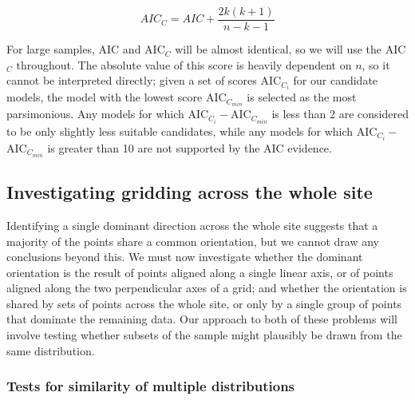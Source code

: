 \documentclass[../../ArchStats.tex]{subfiles}
\begin{document}
\[AIC_C = AIC + \frac{2k(k+1)}{n-k-1} \]

For large samples, AIC and AIC$_C$ will be almost identical, so we will use the AIC$_C$ throughout. The absolute value of this score is heavily dependent on $n$, so it cannot be interpreted directly; given a set of scores AIC$_{C_i}$ for our candidate models, the model with the lowest score AIC$_{C_{min}}$ is selected as the most parsimonious. Any models for which AIC$_{C_i} - $AIC$_{C_{min}}$ is less than 2 are considered to be only slightly less suitable candidates, while any models for which AIC$_{C_i} - $AIC$_{C_{min}}$ is greater than 10 are not supported by the AIC evidence.




\subsection{Investigating gridding across the whole site}
Identifying a single dominant direction across the whole site suggests that a majority of the points share a common orientation, but we cannot draw any conclusions beyond this. We must now investigate whether the dominant orientation is the result of points aligned along a single linear axis, or of points aligned along the two perpendicular axes of a grid; and whether the orientation is shared by sets of points across the whole site, or only by a single group of points that dominate the remaining data. Our approach to both of these problems will involve testing whether subsets of the sample might plausibly be drawn from the same distribution.

\subsubsection{Tests for similarity of multiple distributions}

\end{document}
